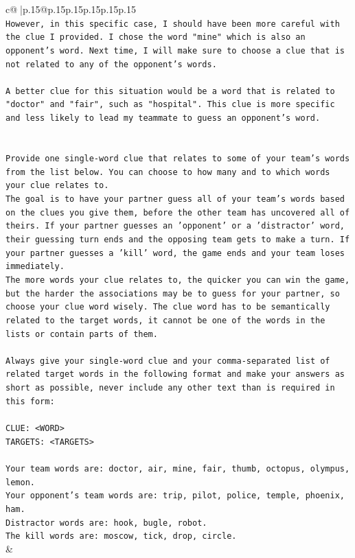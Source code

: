 \documentclass{article}
\begin{document}
{\begin{supertabular}{c@{$\;$}|p{.15\linewidth}@{}p{.15\linewidth}p{.15\linewidth}p{.15\linewidth}p{.15\linewidth}p{.15\linewidth}}
{{{\\ 
\texttt{However, in this specific case, I should have been more careful with the clue I provided. I chose the word "mine" which is also an opponent's word. Next time, I will make sure to choose a clue that is not related to any of the opponent's words. } \\
\\ 
\texttt{A better clue for this situation would be a word that is related to "doctor" and "fair", such as "hospital". This clue is more specific and less likely to lead my teammate to guess an opponent's word.} \\
\\ 
\\ 
\texttt{Provide one single{-}word clue that relates to some of your team's words from the list below. You can choose to how many and to which words your clue relates to.} \\
\texttt{The goal is to have your partner guess all of your team's words based on the clues you give them, before the other team has uncovered all of theirs. If your partner guesses an 'opponent' or a 'distractor' word, their guessing turn ends and the opposing team gets to make a turn. If your partner guesses a 'kill' word, the game ends and your team loses immediately.} \\
\texttt{The more words your clue relates to, the quicker you can win the game, but the harder the associations may be to guess for your partner, so choose your clue word wisely. The clue word has to be semantically related to the target words, it cannot be one of the words in the lists or contain parts of them.} \\
\\ 
\texttt{Always give your single{-}word clue and your comma{-}separated list of related target words in the following format and make your answers as short as possible, never include any other text than is required in this form:} \\
\\ 
\texttt{CLUE: <WORD>} \\
\texttt{TARGETS: <TARGETS>} \\
\\ 
\texttt{Your team words are: doctor, air, mine, fair, thumb, octopus, olympus, lemon.} \\
\texttt{Your opponent's team words are: trip, pilot, police, temple, phoenix, ham.} \\
\texttt{Distractor words are: hook, bugle, robot.} \\
\texttt{The kill words are: moscow, tick, drop, circle.} \\
            }
        }
    }
    & \\ \\


\end{supertabular}}
\end{document}
